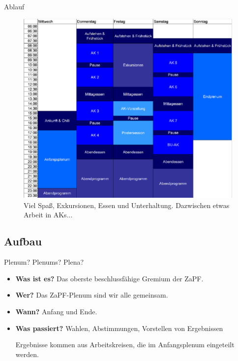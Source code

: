 \documentclass[compress,]{beamer}
\begin{document}
\begin{frame}{Ablauf}

  \begin{figure}
    \centering
    \includegraphics[scale=0.8]{SoSe18_Programm.pdf}

    \caption{Viel Spaß, Exkursionen, Essen und Unterhaltung. Dazwischen etwas Arbeit in AKs...}
  \end{figure}

\end{frame}


\subsection{Aufbau}

\begin{frame}{Plenum? Plenums? Plena?}

  \begin{itemize}[<+->]
  \item \textbf{Was ist es?} Das oberste beschlussfähige Gremium der ZaPF.
  \item \textbf{Wer?} Das ZaPF-Plenum sind wir alle gemeinsam.
  \item \textbf{Wann?} Anfang und Ende.
  \item \textbf{Was passiert?} Wahlen, Abstimmungen, Vorstellen von Ergebnissen

    Ergebnisse kommen aus Arbeitskreisen, die im Anfangsplenum eingeteilt werden.
  \end{itemize}


\end{frame}
\end{document}
